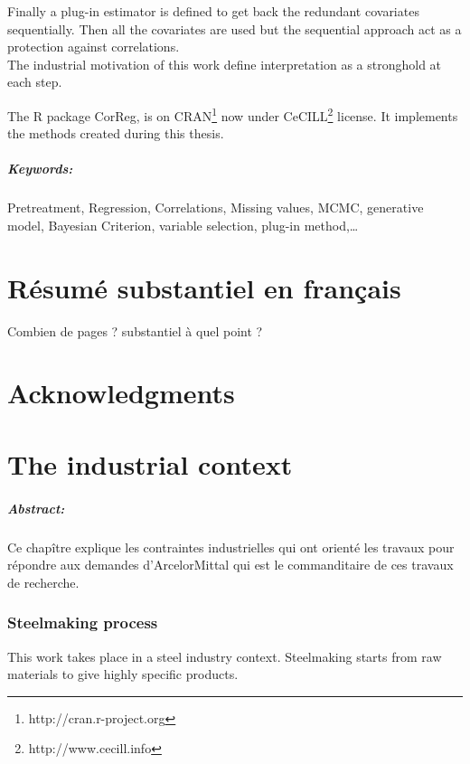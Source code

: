 \documentclass[12pt,a4paper]{report}
\begin{document}
	Finally a plug-in estimator is defined to get back the redundant covariates sequentially. Then all the covariates are used but the sequential approach act as a protection against correlations.
\\

	The industrial motivation of this work define interpretation as a stronghold at each step. 	
	
	The R package CorReg, is on CRAN\footnote{http://cran.r-project.org} now under CeCILL\footnote{http://www.cecill.info} license. It implements the methods created during this thesis.
	
	 	
\paragraph{Keywords:} Pretreatment, Regression, Correlations, Missing values, MCMC, generative model, Bayesian Criterion, variable selection, plug-in method,\dots
\chapter*{Résumé substantiel en français}
	Combien de pages ? substantiel à quel point ?
\chapter*{Acknowledgments}






\tableofcontents

\chapter{The industrial context}
	\paragraph{Abstract:} Ce chapître explique les contraintes industrielles qui ont orienté les travaux pour répondre aux demandes d'ArcelorMittal qui est le commanditaire de ces travaux de recherche.
\subsection{Steelmaking process}
	This work takes place in a steel industry context.
	Steelmaking starts from raw materials to give highly specific products.
	
\end{document}

